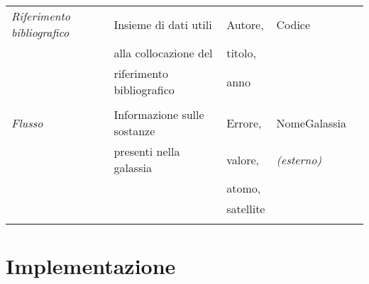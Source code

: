 \documentclass[12pt,a4paper,onecolumn]{article}
\begin{document}
\begin{table}[h!]
\begin{tabular}{lllll}
%
			\textit{Riferimento bibliografico}	& Insieme di dati utili & Autore,		&	Codice				\\
				& alla collocazione del & titolo,		&					\\
			& riferimento bibliografico & anno		&					\\
			&						&				&					\\
			\textit{Flusso}			& Informazione sulle sostanze & Errore, 		& NomeGalassia \\
			& presenti nella galassia	&	valore,		& \textit{(esterno)}\\
			&							& atomo,		&					\\
			&							& satellite	&						\\
			&							&			&						\\
			
		\end{tabular}
	\end{table}

\newpage

\section{Implementazione}
\end{document}
